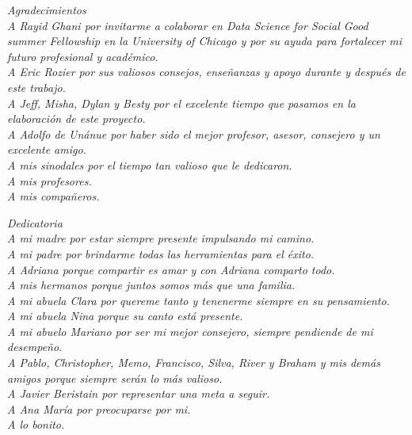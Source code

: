 \begin{flushright}
\textit{ \LARGE Agradecimientos \\ \bigskip \bigskip \bigskip 
\normalsize 
A Rayid Ghani por invitarme a colaborar en Data Science for Social Good summer Fellowship en la University of Chicago y por su ayuda para fortalecer mi futuro profesional y académico.\\
A Eric Rozier por sus valiosos consejos, enseñanzas y apoyo durante y después de este trabajo.\\
A Jeff, Misha, Dylan y Besty por el excelente tiempo que pasamos en la elaboración de este proyecto.\\
A Adolfo de Unánue por haber sido el mejor profesor, asesor, consejero y un excelente amigo.\\
A mis sinodales por el tiempo tan valioso que le dedicaron.\\
A mis profesores.\\
A mis compañeros.\\
}
\end{flushright}

\newpage

\thispagestyle{plain}



\begin{flushright}
\textit{ \LARGE  Dedicatoria\\ \bigskip \bigskip \bigskip 
\normalsize A mi madre por estar siempre presente impulsando mi camino.\\
A mi padre por brindarme todas las herramientas para el éxito.\\
A Adriana porque compartir es amar y con Adriana comparto todo.\\
A mis hermanos porque juntos somos más que una familia.\\
A mi abuela Clara por quereme tanto y tenenerme siempre en su pensamiento.\\
A mi abuela Nina porque su canto está presente.\\
A mi abuelo Mariano por ser mi mejor consejero, siempre pendiende de mi desempeño.\\
A Pablo, Christopher, Memo, Francisco, Silva, River y Braham y mis demás amigos porque siempre serán lo más valioso.\\
A Javier Beristain por representar una meta a seguir.\\
A Ana María por preocuparse por mi.\\
A lo bonito.\\
}
\end{flushright}


\tableofcontents
\thispagestyle{plain}

\listoffigures
\thispagestyle{plain}

\listoftables
\newpage

